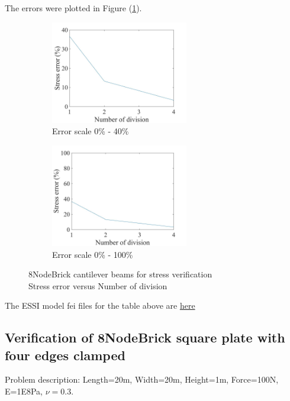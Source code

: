 \documentclass[fleqn,11pt]{article}
\begin{document}
The errors were plotted in Figure (\ref{fig 8NodeBrick cantilever beams for stress verification}).
\begin{figure}[H]
  \begin{subfigure}{0.5\textwidth}
    \centering
    \includegraphics[width=6cm]{../Figure-files/error8brick_beam_stress.jpeg}
    \caption{Error scale 0\% - 40\%}
  \end{subfigure}
  \begin{subfigure}{0.5\textwidth}
    \centering
    \includegraphics[width=6cm]{../Figure-files/error8brick_beam_stress100.jpeg}
    \caption{Error scale 0\% - 100\%}
  \end{subfigure}
  \captionsetup{justification=centering,margin=3cm}
  \caption{8NodeBrick cantilever beams for stress verification\\
      Stress error   versus   Number of division}
  \label{fig 8NodeBrick cantilever beams for stress verification}
\end{figure}


The ESSI model fei files for the table above are \href{https://github.com/yuan-energy/ESSI_Verification/blob/master/8NodeBrick/cantilever_stress/cantilever_stress.tar.gz?raw=true}{here}




\newpage
\subsection{Verification of 8NodeBrick square plate with four edges clamped}

Problem description: Length=20m, Width=20m, Height=1m, Force=100N, E=1E8Pa, $\nu=0.3$. 
\end{document}
